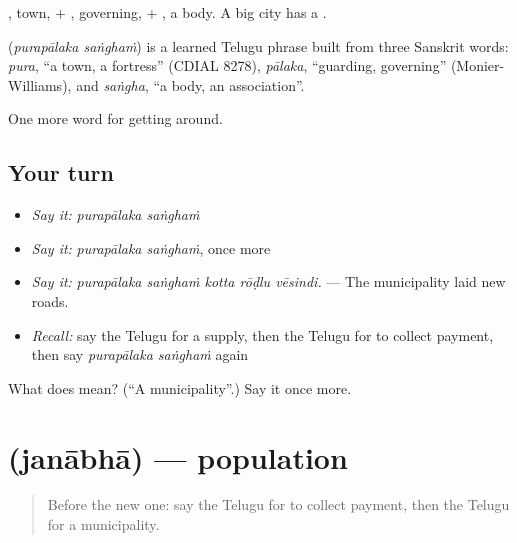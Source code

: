 , town, + , governing, + , a body. A big city has a  .

\begin{cousinweb}
\textbf{ } (\emph{purapālaka saṅghaṁ}) is a learned Telugu phrase built from three Sanskrit words: \emph{pura}, \textquotedblleft{}a town, a fortress\textquotedblright{} (CDIAL 8278), \emph{pālaka}, \textquotedblleft{}guarding, governing\textquotedblright{} (Monier-Williams), and \emph{saṅgha}, \textquotedblleft{}a body, an association\textquotedblright{}.
\end{cousinweb}

\begin{grammarlens}[title={What you've built}]
One more word for getting around.
\end{grammarlens}

\subsection*{Your turn}
\begin{itemize}
\raggedright
  \item \emph{Say it:} \emph{purapālaka saṅghaṁ}
  \item \emph{Say it:} \emph{purapālaka saṅghaṁ}, once more
  \item \emph{Say it:} \emph{purapālaka saṅghaṁ kotta rōḍlu vēsindi.} — The municipality laid new roads.
  \item \emph{Recall:} say the Telugu for a supply, then the Telugu for to collect payment, then say \emph{purapālaka saṅghaṁ} again
\end{itemize}

\begin{tcolorbox}[breakable,colback=teal!4,colframe=teal!35!black,title={Before you move on}]
What does   mean? (\textquotedblleft{}A municipality\textquotedblright{}.) Say it once more.
\end{tcolorbox}
\section[\texorpdfstring{\te{జనాభా} (janābhā)}{జనాభా (janābhā)}]{ (janābhā) — population}

\label{lesson:TE-C465-janabha}



\begin{quote}
Before the new one: say the Telugu for to collect payment, then the Telugu for a municipality.
\end{quote}

